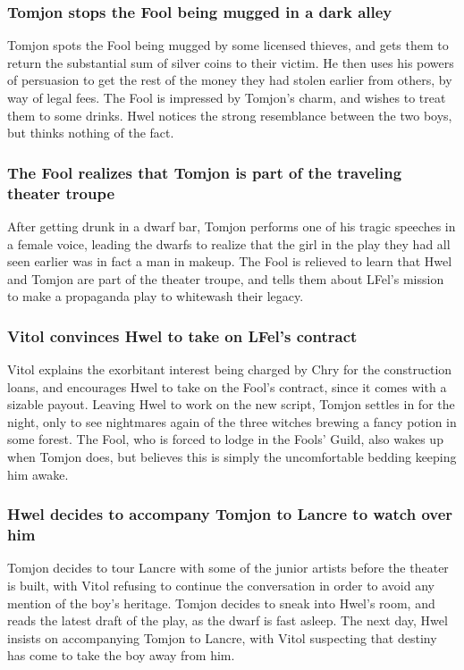 \subsubsection{\Gls{Tomjon} stops the \Gls{Fool} being mugged in a dark alley}
\Gls{Tomjon} spots the \Gls{Fool} being mugged by some licensed thieves, and gets them to return
the substantial sum of silver coins to their victim. He then uses his powers of persuasion to get
the rest of the money they had stolen earlier from others, by way of legal fees. The \Gls{Fool} is
impressed by \Gls{Tomjon}'s charm, and wishes to treat them to some drinks. \Gls{Hwel} notices the
strong resemblance between the two boys, but thinks nothing of the fact.

\subsubsection{The \Gls{Fool} realizes that \Gls{Tomjon} is part of the traveling theater troupe}
After getting drunk in a dwarf bar, \Gls{Tomjon} performs one of his tragic speeches in a female
voice, leading the dwarfs to realize that the girl in the play they had all seen earlier was in
fact a man in makeup. The \Gls{Fool} is relieved to learn that \Gls{Hwel} and \Gls{Tomjon} are part
of the theater troupe, and tells them about \Gls{LFel}'s mission to make a propaganda play to
whitewash their legacy.

\subsubsection{\Gls{Vitol} convinces \Gls{Hwel} to take on \Gls{LFel}'s contract}
\Gls{Vitol} explains the exorbitant interest being charged by \Gls{Chry} for the construction loans,
and encourages \Gls{Hwel} to take on the \Gls{Fool}'s contract, since it comes with a sizable
payout. Leaving \Gls{Hwel} to work on the new script, \Gls{Tomjon} settles in for the night, only
to see nightmares again of the three witches brewing a fancy potion in some forest. The \Gls{Fool},
who is forced to lodge in the Fools' Guild, also wakes up when \Gls{Tomjon} does, but believes this
is simply the uncomfortable bedding keeping him awake.

\subsubsection{\Gls{Hwel} decides to accompany \Gls{Tomjon} to Lancre to watch over him}
\Gls{Tomjon} decides to tour Lancre with some of the junior artists before the theater is built,
with \Gls{Vitol} refusing to continue the conversation in order to avoid any mention of the boy's
heritage. \Gls{Tomjon} decides to sneak into \Gls{Hwel}'s room, and reads the latest draft of the
play, as the dwarf is fast asleep. The next day, \Gls{Hwel} insists on accompanying \Gls{Tomjon} to
Lancre, with \Gls{Vitol} suspecting that destiny has come to take the boy away from him.

